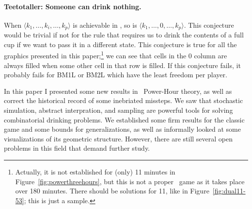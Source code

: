 \documentclass[twocolumn]{article}
\begin{document}
\paragraph{Teetotaller: Someone can drink nothing.} When $\langle k_1, 
\ldots, k_i, \ldots, k_p \rangle$ is achievable in \bmsl, so is
$\langle k_1, \ldots, 0, \ldots, k_p \rangle$. This conjecture would
be trivial if not for the rule that requires us to drink the contents
of a full cup if we want to pass it in a different state. This
conjecture is true for all the graphics presented in this
paper;\footnote{Actually, it is not established for (only) 11 minutes
  in Figure~\ref{fig:powerthreehours}, but this is not a proper
  \bmsl\ game as it takes place over 180 minutes. There should be
  solutions for 11, like in Figure~\ref{fig:dual11-53}; this is just
  a sample.} we can see that
cells in the 0 column are always filled when some other cell in that
row is filled. If this conjecture fails, it probably fails for BM1L or
BM2L which have the least freedom per player.

\medskip

In this paper I presented some new results in \kn\ Power-Hour theory, as
well as correct the historical record of some inebriated missteps. We
saw that stochastic simulation, abstract interpration, and sampling
are powerful tools for solving combinatorial drinking problems. We
established some firm results for the classic game and some bounds for
generalizations, as well as informally looked at some visualizations
of its geometric structure. However, there are still several open
problems in this field that demand further study.

{}

\end{document}
